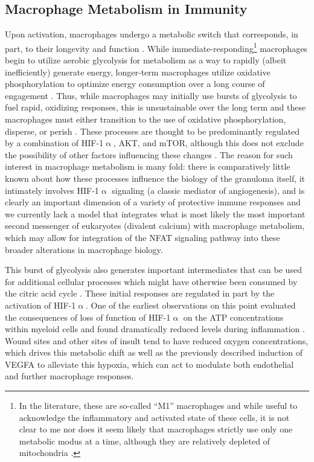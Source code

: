 \subsection{Macrophage Metabolism in Immunity}\label{metabolism}

Upon activation, macrophages undergo a metabolic switch that corresponds, in part, to their longevity and function \citep{Kolliniati2022}. While immediate\hyp{}responding\footnote{In the literature, these are so\hyp{}called ``M1'' macrophages and while useful to acknowledge the inflammatory and activated state of these cells, it is not clear to me nor does it seem likely that macrophages strictly use only one metabolic modus at a time, although they are relatively depleted of mitochondria \citep{Biswas2012}.} macrophages begin to utilize aerobic glycolysis for metabolism as a way to rapidly (albeit inefficiently) generate energy, longer\hyp{}term macrophages utilize oxidative phosphorylation to optimize energy consumption over a long course of engagement \citep{Shi2019, Kiran2016, Viola2019, Langston2017, Taylor2022}. Thus, while macrophages may initially use bursts of glycolysis to fuel rapid, oxidizing responses, this is unsustainable over the long term and these macrophages must either transition to the use of oxidative phosphorylation, disperse, or perish \citep{Odegaard2011, Howard2020}. These processes are thought to be predominantly regulated by a combination of HIF\hyp{}1$\upalpha$, AKT, and mTOR, although this does not exclude the possibility of other factors influencing these changes \citep{Covarrubias2015}. The reason for such interest in macrophage metabolism is many fold: there is comparatively little known about how these processes influence the biology of the granuloma itself, it intimately involves HIF\hyp{}1$\upalpha$ signaling (a classic mediator of angiogenesis), and is clearly an important dimension of a variety of protective immune responses and we currently lack a model that integrates what is most likely the most important second messenger of eukaryotes (divalent calcium) with macrophage metabolism, which may allow for integration of the NFAT signaling pathway into these broader alterations in macrophage biology.

This burst of glycolysis also generates important intermediates that can be used for additional cellular processes which might have otherwise been consumed by the citric acid cycle \citep{Viola2019, Kelly2015}. These initial responses are regulated in part by the activation of HIF\hyp{}1$\upalpha$. One of the earliest observations on this point evaluated the consequences of loss of function of HIF\hyp{}1$\upalpha$ on the ATP concentrations within myeloid cells and found dramatically reduced levels during inflammation \citep{Cramer2003}. Wound sites and other sites of insult tend to have reduced oxygen concentrations, which drives this metabolic shift as well as the previously described induction of VEGFA to alleviate this hypoxia, which can act to modulate both endothelial and further macrophage responses. 

